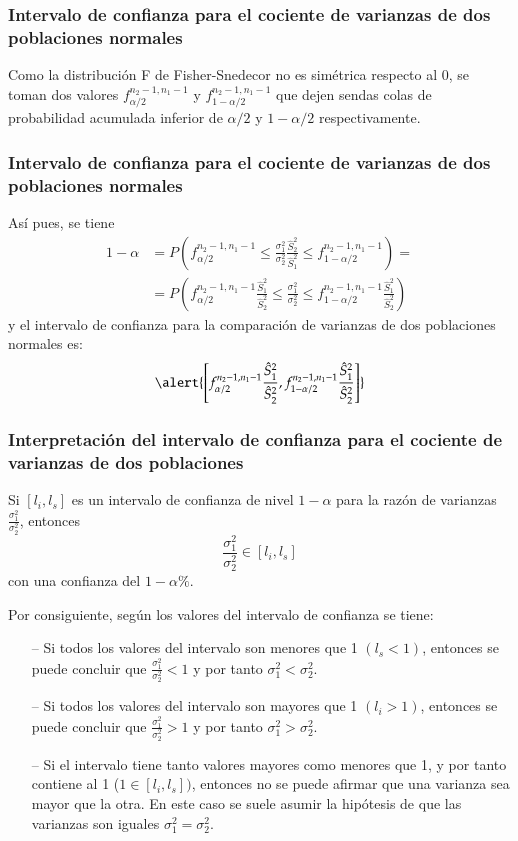 \begin{frame}
\frametitle{Intervalo de confianza para el cociente de varianzas de dos poblaciones normales}
Como la distribución F de Fisher-Snedecor no es simétrica respecto al 0, se toman dos valores $f^{n_2-1,n_1-1}_{\alpha/2}$ y
$f^{n_2-1,n_1-1}_{1-\alpha/2}$ que dejen sendas colas de probabilidad acumulada inferior de $\alpha/2$ y $1-\alpha/2$ respectivamente.
\begin{center}
\scalebox{0.6}{}
\end{center}
\end{frame}


\begin{frame}
\frametitle{Intervalo de confianza para el cociente de varianzas de dos poblaciones normales}
Así pues, se tiene
\[
\begin{align*}
1-\alpha &= P\left(f^{n_2-1,n_1-1}_{\alpha/2}\leq \frac{\sigma_1^2}{\sigma_2^2}\frac{\hat{S}_2^2}{\hat{S}_1^2}  \leq
f^{n_2-1,n_1-1}_{1-\alpha/2}\right) = \\ &= P\left(f^{n_2-1,n_1-1}_{\alpha/2}\frac{\hat{S}_1^2}{\hat{S}_2^2} \leq
\frac{\sigma_1^2}{\sigma_2^2}  \leq f^{n_2-1,n_1-1}_{1-\alpha/2}\frac{\hat{S}_1^2}{\hat{S}_2^2}\right)
\end{align*}
\]
y el intervalo de confianza para la comparación de varianzas de dos poblaciones normales es:
\[
\alert{\left[f^{n_2-1,n_1-1}_{\alpha/2}\frac{\hat{S}_1^2}{\hat{S}_2^2},f^{n_2-1,n_1-1}_{1-\alpha/2}\frac{\hat{S}_1^2}{\hat{S}_2^2}\right]}
\]
\end{frame}


\begin{frame}
\frametitle{Interpretación del intervalo de confianza para el cociente de varianzas de dos poblaciones}
Si $[l_i,l_s]$ es un intervalo de confianza de nivel $1-\alpha$ para la razón de varianzas $\frac{\sigma_1^2}{\sigma_2^2}$, entonces
\[
\frac{\sigma_1^2}{\sigma_2^2} \in [l_i,l_s]
\]
con una confianza del $1-\alpha\%$.

Por consiguiente, según los valores del intervalo de confianza se tiene:
\begin{itemize}
\item[--] Si todos los valores del intervalo son menores que 1 $(l_s<1)$, entonces se puede concluir que
$\frac{\sigma_1^2}{\sigma_2^2}<1$  y por tanto $\sigma_1^2<\sigma_2^2$.
\item[--] Si todos los valores del intervalo son mayores que 1 $(l_i>1)$, entonces se puede concluir que
$\frac{\sigma_1^2}{\sigma_2^2}>1$  y por tanto $\sigma_1^2>\sigma_2^2$.
\item[--] Si el intervalo tiene tanto valores mayores como menores que 1, y por tanto contiene al 1 ($1\in [l_i,l_s])$,
entonces no se puede afirmar que una varianza sea mayor que la otra. En este caso se suele asumir la hipótesis de que las varianzas son iguales $\sigma_1^2=\sigma_2^2$.
\end{itemize}
\end{frame}


